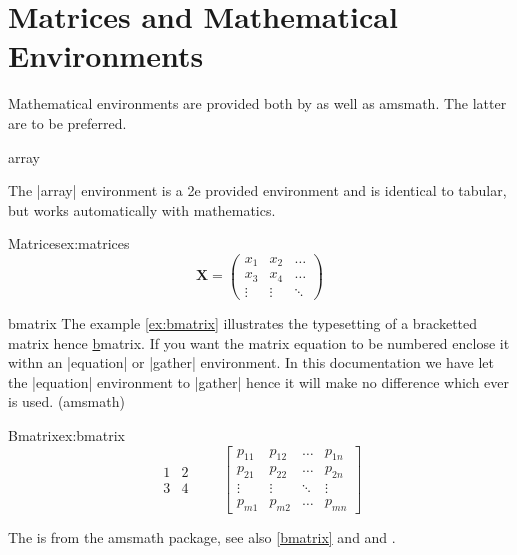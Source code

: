 \chapter{Matrices and Mathematical Environments}
\label{matrices}

Mathematical environments are provided both by \latexe as well as amsmath. The latter are to be preferred.


\begin{docEnvironment}{array}{}
\end{docEnvironment}
The |array| environment is a \latex2e provided environment and is identical to tabular, but works automatically with mathematics. 


\begin{texexample}{Matrices}{ex:matrices}
\[
\mathbf{X} = \left(
\begin{array}{ccc}
x_1 & x_2 & \ldots \\
x_3 & x_4 & \ldots \\
\vdots & \vdots & \ddots
\end{array} \right)
\]
\end{texexample}


\begin{docEnvironment}{bmatrix}{}
The example \ref{ex:bmatrix} illustrates the typesetting of a bracketted matrix hence \ul{b}matrix. If you want the matrix equation to be numbered enclose it withn an |equation| or |gather| environment. In this documentation we have let the |equation| environment to |gather| hence it will make no difference which ever is used. (amsmath)
\end{docEnvironment}

\begin{texexample}{Bmatrix}{ex:bmatrix}
\begin{equation}
\begin{matrix}
1 & 2 \\
3 & 4
\end{matrix} \qquad
\begin{bmatrix}
p_{11} & p_{12} & \ldots & p_{1n} \\
p_{21} & p_{22} & \ldots & p_{2n} \\
\vdots & \vdots & \ddots & \vdots \\
p_{m1} & p_{m2} & \ldots & p_{mn}
\end{bmatrix}
\end{equation}
\end{texexample}

The  is from the amsmath package, see also \vref{bmatrix} and  and \pageref{bmatrix}. 

